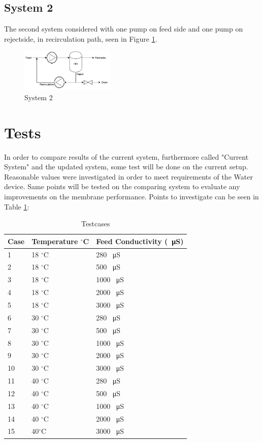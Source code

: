 \subsection{System 2}
The second system considered with one pump on feed side and one pump on rejectside, in recirculation path, seen in Figure \ref{fig:Sys2}.
\begin{figure}[h]
    \centering
    \includegraphics[width=0.4\textwidth]{Sys2}
    \caption{System 2}
    \label{fig:Sys2}
\end{figure}

\section{Tests}
In order to compare results of the current system, furthermore called "Current System" and the updated system, some test will be done on the current setup. Reasonable values were investigated in order to meet requirements of the Water device. Same points will be tested on the comparing system to evaluate any improvements on the membrane performance. Points to investigate can be seen in Table \ref{tab:testcases}:\\
\begin{table}[h]
\begin{tabular}{ |p{1cm}||p{3cm}|p{4cm}|}
 \hline
 \textbf{Case}&Temperature $^\circ$C& Feed Conductivity (\SI{}{\micro\siemens}) \\
 \hline
 1 & 18 $^\circ$C  & 280 \SI{}{\micro\siemens}  \\
 2   &  18 $^\circ$C  & 500 \SI{}{\micro\siemens}  \\
 3 &  18 $^\circ$C & 1000 \SI{}{\micro\siemens}  \\
 4 &18 $^\circ$C& 2000 \SI{}{\micro\siemens}\\
 5   &18 $^\circ$C& 3000 \SI{}{\micro\siemens}\\
 \hline
 6 & 30 $^\circ$C & 280 \SI{}{\micro\siemens}\\
 7 & 30 $^\circ$C & 500 \SI{}{\micro\siemens}\\
 8 & 30 $^\circ$C& 1000 \SI{}{\micro\siemens}\\
 9 & 30 $^\circ$C& 2000 \SI{}{\micro\siemens}\\
 10 & 30 $^\circ$C& 3000 \SI{}{\micro\siemens}\\
 \hline
 11 & 40 $^\circ$C& 280 \SI{}{\micro\siemens}\\
 12 & 40 $^\circ$C& 500 \SI{}{\micro\siemens}\\
 13 & 40 $^\circ$C & 1000 \SI{}{\micro\siemens}\\
 14 & 40 $^\circ$C& 2000 \SI{}{\micro\siemens}\\
 15 & 40$^\circ$C & 3000 \SI{}{\micro\siemens}\\
\hline
\end{tabular}
\caption{Testcases}
    \label{tab:testcases} 
\end{table}


